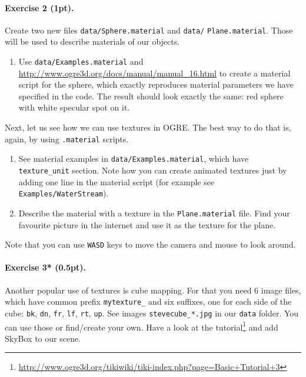 \documentclass{article}
\newenvironment{exercise}[2]{\paragraph{Exercise #1 (#2pt).} }{
\medskip}
\begin{document}
\begin{exercise}{2}{1}
Create two new files \verb#data/Sphere.material# and \verb#data/# \verb#Plane.material#. Those will be used to describe materials of our objects.
\begin{enumerate}
	\item[1.] Use \verb#data/Examples.material# and \url{http://www.ogre3d.org/docs/manual/manual_16.html} to create a material script for the sphere, which exactly reproduces material parameters we have specified in the code. The result should look exactly the same: red sphere with white specular spot on it.
\end{enumerate}
Next, let us see how we can use textures in OGRE. The best way to do that is, again, by using \verb#.material# scripts.
\begin{enumerate}
	\item[2.] See material examples in \verb#data/Examples.material#, which have \verb#texture_unit# section. Note how you can create animated textures just by adding one line in the material script (for example see \verb#Examples/WaterStream#).
	\item[3.] Describe the material with a texture in the \verb#Plane.material# file. Find your favourite picture in the internet and use it as the texture for the plane.
\end{enumerate}
Note that you can use \verb#WASD# keys to move the camera and mouse to look around.

\end{exercise}

\begin{exercise}{3*}{0.5}
Another popular use of textures is cube mapping. For that you need 6 image files, which have common prefix \verb#mytexture_# and six suffixes, one for each side of the cube: \verb#bk#, \verb#dn#, \verb#fr#, \verb#lf#, \verb#rt#, \verb#up#. See images \verb#stevecube_*.jpg# in our \verb#data# folder. You can use those or find/create your own. Have a look at the tutorial\footnote{\url{http://www.ogre3d.org/tikiwiki/tiki-index.php?page=Basic+Tutorial+3}} and add SkyBox to our scene.
\end{exercise}
\end{document}
